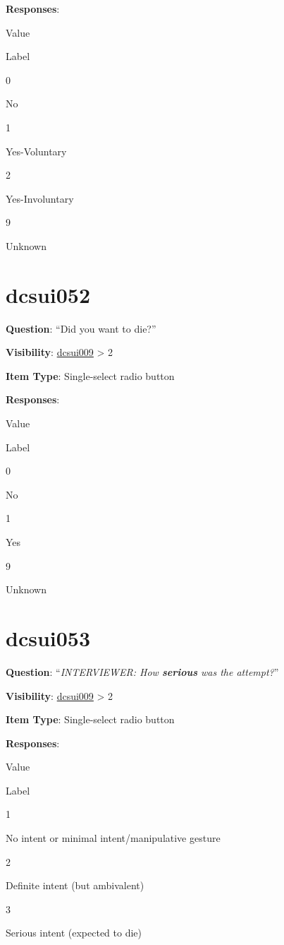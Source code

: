 \documentclass[]{book}
\begin{document}
\textbf{Responses}:

Value

Label

0

No

1

Yes-Voluntary

2

Yes-Involuntary

9

Unknown

\hypertarget{dcsui052}{%
\section{dcsui052}\label{dcsui052}}

\textbf{Question}: ``Did you want to die?''

\textbf{Visibility}: \protect\hyperlink{dcsui009}{dcsui009} \textgreater{} 2

\textbf{Item Type}: Single-select radio button

\textbf{Responses}:

Value

Label

0

No

1

Yes

9

Unknown

\hypertarget{dcsui053}{%
\section{dcsui053}\label{dcsui053}}

\textbf{Question}: ``\emph{INTERVIEWER: How \textbf{serious} was the attempt?}''

\textbf{Visibility}: \protect\hyperlink{dcsui009}{dcsui009} \textgreater{} 2

\textbf{Item Type}: Single-select radio button

\textbf{Responses}:

Value

Label

1

No intent or minimal intent/manipulative gesture

2

Definite intent (but ambivalent)

3

Serious intent (expected to die)
\end{document}
